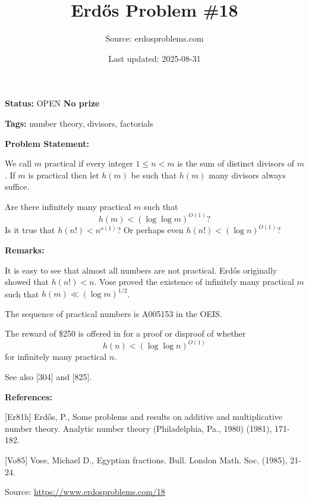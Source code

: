 \documentclass{article}
\title{Erd\H{o}s Problem \#18}
\date{Last updated: 2025-08-31}
\author{Source: erdosproblems.com}
\begin{document}
\maketitle

\noindent\textbf{Status:} OPEN \quad \textbf{No prize}

\noindent\textbf{Tags:} number theory, divisors, factorials

\medskip
\noindent\textbf{Problem Statement:}

We call $m$ practical if every integer $1\leq n<m$ is the sum of distinct divisors of $m$. If $m$ is practical then let $h(m)$ be such that $h(m)$ many divisors always suffice.

Are there infinitely many practical $m$ such that\[h(m) < (\log\log m)^{O(1)}?\]Is it true that $h(n!)<n^{o(1)}$? Or perhaps even $h(n!)<(\log n)^{O(1)}$?

\bigskip
\noindent\textbf{Remarks:}

It is easy to see that almost all numbers are not practical. Erd\H{o}s originally showed that $h(n!) <n$. Vose \cite{Vo85} proved the existence of infinitely many practical $m$ such that $h(m)\ll (\log m)^{1/2}$. 

The sequence of practical numbers is A005153 in the OEIS.

The reward of \$250 is offered in \cite{Er81h} for a proof or disproof of whether\[h(n) <(\log \log n)^{O(1)}\]for infinitely many practical $n$.

See also [304] and [825].

\bigskip
\noindent\textbf{References:}

[Er81h] Erd\H{o}s, P., Some problems and results on additive and multiplicative
number theory. Analytic number theory (Philadelphia, Pa., 1980) (1981), 171-182.
 
 [Vo85] Vose, Michael D., Egyptian fractions. Bull. London Math. Soc. (1985), 21-24.

\bigskip
\noindent\small{Source: \url{https://www.erdosproblems.com/18}}
\end{document}

